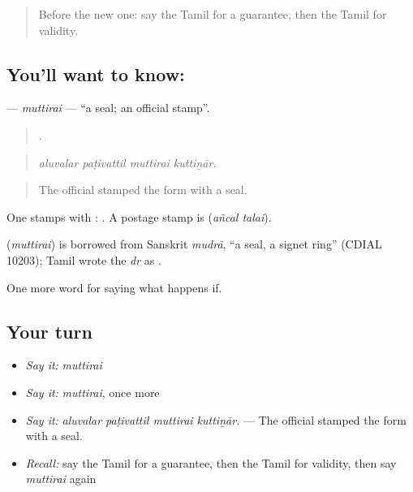 \label{lesson:TA-C542-muttirai}



\begin{quote}
Before the new one: say the Tamil for a guarantee, then the Tamil for validity.
\end{quote}

\subsection*{You'll want to know: }
\textbf{} — \emph{muttirai} — \textquotedblleft{}a seal; an official stamp\textquotedblright{}.

\begin{quote}
   .
\end{quote}

\begin{quote}
\emph{aluvalar paṭivattil muttirai kuttiṉār.}
\end{quote}

\begin{quote}
The official stamped the form with a seal.
\end{quote}

One stamps with :  . A postage stamp is   (\emph{añcal talai}).

\begin{cousinweb}
\textbf{} (\emph{muttirai}) is borrowed from Sanskrit \emph{mudrā}, \textquotedblleft{}a seal, a signet ring\textquotedblright{} (CDIAL 10203); Tamil wrote the \emph{dr} as .
\end{cousinweb}

\begin{grammarlens}[title={What you've built}]
One more word for saying what happens if.
\end{grammarlens}

\subsection*{Your turn}
\begin{itemize}
\raggedright
  \item \emph{Say it:} \emph{muttirai}
  \item \emph{Say it:} \emph{muttirai}, once more
  \item \emph{Say it:} \emph{aluvalar paṭivattil muttirai kuttiṉār.} — The official stamped the form with a seal.
  \item \emph{Recall:} say the Tamil for a guarantee, then the Tamil for validity, then say \emph{muttirai} again
\end{itemize}


